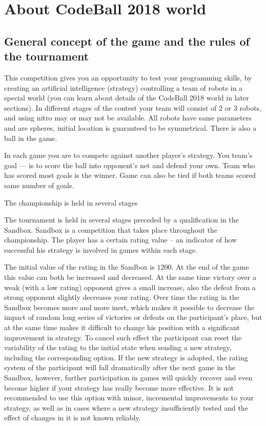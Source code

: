 \chapter{About CodeBall 2018 world}

\newcommand{\const}[1]{\texttt{#1}}

\section{General concept of the game and the rules of the tournament}

This competition gives you an opportunity to test your programming skills,
by creating an artificial intelligence (strategy)
controlling a team of robots in a special world
(you can learn about details of the CodeBall 2018 world in later sections).
In different stages of the contest your team will consist of 2 or 3 robots,
and using nitro may or may not be available.
All robots have same parameters and are spheres, initial location is guaranteed to be symmetrical.
There is also a ball in the game.

In each game you are to compete against another player's strategy.
You team's goal --- is to score the ball into opponent's net and defend your own.
Team who has scored most goals is the winner.
Game can also be tied if both teams scored same number of goals.

The championship is held in several stages

The tournament is held in several stages preceded by a qualification in the Sandbox.
Sandbox is a competition that takes place throughout the championship.
The player has a certain rating value -- an indicator of how successful
his strategy is involved in games within each stage.

The initial value of the rating in the Sandbox is $1200$. At the end of the game this value can both be increased and decreased. At the same time victory
over a weak (with a low rating) opponent gives a small increase, also the defeat from a strong opponent slightly decreases your
rating. Over time the rating in the Sandbox becomes more and more inert, which makes it possible to decrease the impact of random long series of victories or
defeats on the participant's place, but at the same time makes it difficult to change his position with a significant improvement in strategy. To cancel such effect
the participant can reset the variability of the rating to the initial state when sending a new strategy, including the corresponding
option. If the new strategy is adopted, the rating system of the participant will fall dramatically after the next game in the Sandbox, however,
further participation in games will quickly recover and even become higher if your strategy has really become more effective. It is not recommended
to use this option with minor, incremental improvements to your strategy, as well as in cases where a new strategy
insufficiently tested and the effect of changes in it is not known reliably.

